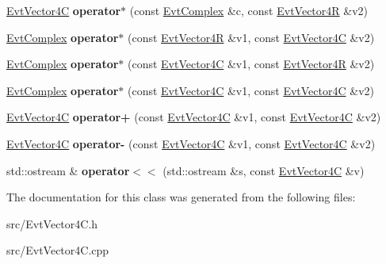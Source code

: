 \begin{DoxyCompactItemize}
\item 
\hypertarget{class_evt_vector4_c_ac12a943f14897d00c6d419b96f509e0b}{}\hyperlink{class_evt_vector4_c}{Evt\+Vector4\+C} {\bfseries operator$\ast$} (const \hyperlink{class_evt_complex}{Evt\+Complex} \&c, const \hyperlink{class_evt_vector4_r}{Evt\+Vector4\+R} \&v2)\label{class_evt_vector4_c_ac12a943f14897d00c6d419b96f509e0b}

\item 
\hypertarget{class_evt_vector4_c_a80b0f960cfe2902afcc4c6fbc86e84b2}{}\hyperlink{class_evt_complex}{Evt\+Complex} {\bfseries operator$\ast$} (const \hyperlink{class_evt_vector4_r}{Evt\+Vector4\+R} \&v1, const \hyperlink{class_evt_vector4_c}{Evt\+Vector4\+C} \&v2)\label{class_evt_vector4_c_a80b0f960cfe2902afcc4c6fbc86e84b2}

\item 
\hypertarget{class_evt_vector4_c_aecfbe8d8783d99d60220534661892cae}{}\hyperlink{class_evt_complex}{Evt\+Complex} {\bfseries operator$\ast$} (const \hyperlink{class_evt_vector4_c}{Evt\+Vector4\+C} \&v1, const \hyperlink{class_evt_vector4_r}{Evt\+Vector4\+R} \&v2)\label{class_evt_vector4_c_aecfbe8d8783d99d60220534661892cae}

\item 
\hypertarget{class_evt_vector4_c_a6ea3e57cb46027fade5955545075a48d}{}\hyperlink{class_evt_complex}{Evt\+Complex} {\bfseries operator$\ast$} (const \hyperlink{class_evt_vector4_c}{Evt\+Vector4\+C} \&v1, const \hyperlink{class_evt_vector4_c}{Evt\+Vector4\+C} \&v2)\label{class_evt_vector4_c_a6ea3e57cb46027fade5955545075a48d}

\item 
\hypertarget{class_evt_vector4_c_a9b55770874998f5d6d642b726e55dfa4}{}\hyperlink{class_evt_vector4_c}{Evt\+Vector4\+C} {\bfseries operator+} (const \hyperlink{class_evt_vector4_c}{Evt\+Vector4\+C} \&v1, const \hyperlink{class_evt_vector4_c}{Evt\+Vector4\+C} \&v2)\label{class_evt_vector4_c_a9b55770874998f5d6d642b726e55dfa4}

\item 
\hypertarget{class_evt_vector4_c_a6006fbf10ca5293c913d60d7f2d171a9}{}\hyperlink{class_evt_vector4_c}{Evt\+Vector4\+C} {\bfseries operator-\/} (const \hyperlink{class_evt_vector4_c}{Evt\+Vector4\+C} \&v1, const \hyperlink{class_evt_vector4_c}{Evt\+Vector4\+C} \&v2)\label{class_evt_vector4_c_a6006fbf10ca5293c913d60d7f2d171a9}

\item 
\hypertarget{class_evt_vector4_c_a41120dfeb23fa3ca25350be4a60d420f}{}std\+::ostream \& {\bfseries operator$<$$<$} (std\+::ostream \&s, const \hyperlink{class_evt_vector4_c}{Evt\+Vector4\+C} \&v)\label{class_evt_vector4_c_a41120dfeb23fa3ca25350be4a60d420f}

\end{DoxyCompactItemize}


The documentation for this class was generated from the following files\+:\begin{DoxyCompactItemize}
\item 
src/Evt\+Vector4\+C.\+h\item 
src/Evt\+Vector4\+C.\+cpp\end{DoxyCompactItemize}
